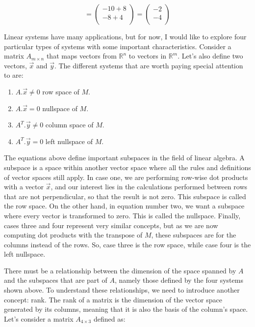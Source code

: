 \documentclass[a4,12pt,twosided,openany]{memoir}
\begin{document}
\[ = \begin{pmatrix}
-10+8  \\
-8+4 \\
\end{pmatrix} = \begin{pmatrix}
-2  \\
-4 \\
\end{pmatrix}\]
\par 
\indent
Linear systems have many applications, but for now, I would like to explore four particular types of systems with some important characteristics. Consider a matrix $A_{m \times n}$ that maps vectors from $\mathbb{R}^n$ to vectors in $\mathbb{R}^m$. Let’s also define two vectors, $\overrightarrow{x}$ and $\overrightarrow{y}$. The different systems that are worth paying special attention to are:
\begin{tcolorbox}
\begin{enumerate}
\item $A.\overrightarrow{x} \neq 0$ row space of $M$.
\item $A.\overrightarrow{x} = 0$ nullspace of $M$.
\item $A^T.\overrightarrow{y} \neq 0$ column space of $M$.
\item $A^T.\overrightarrow{y} = 0$ left nullspace of $M$.
\end{enumerate}
\end{tcolorbox}
\par 
\indent
The equations above define important subspaces in the field of linear algebra. A subspace is a space within another vector space where all the rules and definitions of vector spaces still apply. In case one, we are performing row-wise dot products with a vector $\overrightarrow{x}$, and our interest lies in the calculations performed between rows that are not perpendicular, so that the result is not zero. This subspace is called the row space. On the other hand, in equation number two, we want a subspace where every vector is transformed to zero. This is called the nullspace. Finally, cases three and four represent very similar concepts, but as we are now computing dot products with the transpose of $M$, these subspaces are for the columns instead of the rows. So, case three is the row space, while case four is the left nullspace. 
\par 
\indent
There must be a relationship between the dimension of the space spanned by $A$ and the subspaces that are part of $A$, namely those defined by the four systems shown above. To understand these relationships, we need to introduce another concept: rank. The rank of a matrix is the dimension of the vector space generated by its columns, meaning that it is also the basis of the column’s space. Let’s consider a matrix $A_{4 \times 3}$ defined as:
\end{document}
